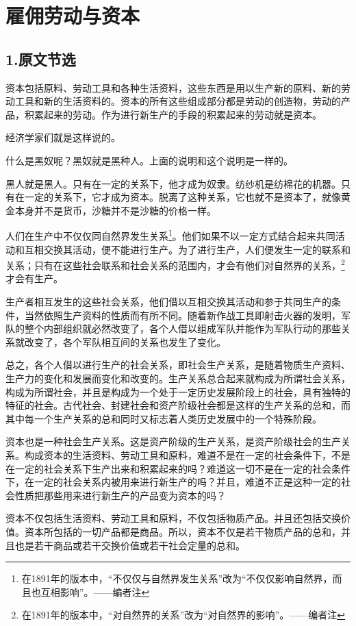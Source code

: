 \documentclass[a4paper,twoside,12pt,AutoFakeBold]{ctexart}
\begin{document}
\newpage
\section{雇佣劳动与资本}

\subsection{1.原文节选}
资本包括原料、劳动工具和各种生活资料，这些东西是用以生产新的原料、新的劳动工具和新的生活资料的。资本的所有这些组成部分都是劳动的创造物，劳动的产品，积累起来的劳动。作为进行新生产的手段的积累起来的劳动就是资本。

经济学家们就是这样说的。

什么是黑奴呢？黑奴就是黑种人。上面的说明和这个说明是一样的。

黑人就是黑人。只有在一定的关系下，他才成为奴隶。纺纱机是纺棉花的机器。只有在一定的关系下，它才成为资本。脱离了这种关系，它也就不是资本了，就像黄金本身并不是货币，沙糖并不是沙糖的价格一样。

人们在生产中不仅仅同自然界发生关系\footnote{在1891年的版本中，“不仅仅与自然界发生关系”改为“不仅仅影响自然界，而且也互相影响”。——编者注}。他们如果不以一定方式结合起来共同活动和互相交换其活动，便不能进行生产。为了进行生产，人们便发生一定的联系和关系；只有在这些社会联系和社会关系的范围内，才会有他们对自然界的关系，\footnote{在1891年的版本中，“对自然界的关系”改为“对自然界的影响”。——编者注}才会有生产。

生产者相互发生的这些社会关系，他们借以互相交换其活动和参于共同生产的条件，当然依照生产资料的性质而有所不同。随着新作战工具即射击火器的发明，军队的整个内部组织就必然改变了，各个人借以组成军队并能作为军队行动的那些关系就改变了，各个军队相互间的关系也发生了变化。

总之，各个人借以进行生产的社会关系，即社会生产关系，是随着物质生产资料、生产力的变化和发展而变化和改变的。生产关系总合起来就构成为所谓社会关系，构成为所谓社会，并且是构成为一个处于一定历史发展阶段上的社会，具有独特的特征的社会。古代社会、封建社会和资产阶级社会都是这样的生产关系的总和，而其中每一个生产关系的总和同时又标志着人类历史发展中的一个特殊阶段。

资本也是一种社会生产关系。这是资产阶级的生产关系，是资产阶级社会的生产关系。构成资本的生活资料、劳动工具和原料，难道不是在一定的社会条件下，不是在一定的社会关系下生产出来和积累起来的吗？难道这一切不是在一定的社会条件下，在一定的社会关系内被用来进行新生产的吗？并且，难道不正是这种一定的社会性质把那些用来进行新生产的产品变为资本的吗？

资本不仅包括生活资料、劳动工具和原料，不仅包括物质产品。并且还包括交换价值。资本所包括的一切产品都是商品。所以，资本不仅是若干物质产品的总和，并且也是若干商品或若干交换价值或若干社会定量的总和。
\end{document}
